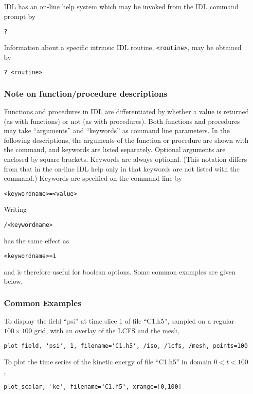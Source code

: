IDL has an on-line help system which may be invoked from the IDL
command prompt by
\begin{verbatim}
?
\end{verbatim}
Information about a specific intrinsic IDL routine,
\texttt{<routine>}, may be obtained by
\begin{verbatim}
? <routine>
\end{verbatim}


\subsubsection{Note on function/procedure descriptions}

Functions and procedures in IDL are differentiated by whether a value
is returned (as with functions) or not (as with procedures).  Both
functions and procedures may take ``arguments'' and ``keywords'' as
command line parameters.  In the following descriptions, the arguments
of the function or procedure are shown with the command, and keywords
are listed separately.  Optional arguments are enclosed by square
brackets.  Keywords are always optional.  (This notation differs from
that in the on-line IDL help only in that keywords are not listed with
the command.)  Keywords are specified on the command line by
\begin{verbatim}
<keywordname>=<value>
\end{verbatim}
Writing
\begin{verbatim}
/<keywordname> 
\end{verbatim}
has the same effect as
\begin{verbatim}
<keywordname>=1
\end{verbatim}
and is therefore useful for boolean options.  Some common examples are
given below.


\subsubsection{Common Examples}

To display the field ``psi'' at time slice 1 of file ``C1.h5'',
sampled on a regular $100\times100$ grid, with an overlay of the LCFS
and the mesh,
\begin{verbatim}
plot_field, 'psi', 1, filename='C1.h5', /iso, /lcfs, /mesh, points=100
\end{verbatim}

To plot the time series of the kinetic energy of file ``C1.h5'' in
domain $0 < t < 100$, 
\begin{verbatim}
plot_scalar, 'ke', filename='C1.h5', xrange=[0,100]
\end{verbatim}

